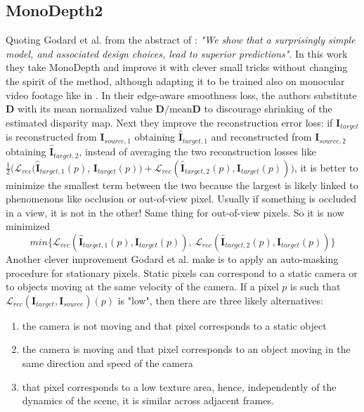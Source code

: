 \subsection{MonoDepth2}
Quoting Godard et al. from the abstract of \cite{MonoDepth2}: \textit{"We show that a surprisingly simple model, and associated design choices, lead to superior predictions"}.
In this work they take MonoDepth \cite{MonoDepth} and improve it with clever small tricks without changing the spirit of the method, although adapting it to be trained also on monocular video footage like in \cite{SfMLearner}.
In their edge-aware smoothness loss, the authors substitute $\mathbf{D}$ with its mean normalized value $\mathbf{D} / \text{mean} \mathbf{D}$ to discourage shrinking of the estimated disparity map.
Next they improve the reconstruction error loss: if $\mathbf{I}_{target}$ is reconstructed from $\mathbf{I}_{source, 1}$ obtaining $\hat{\mathbf{I}}_{target, 1}$ and reconstructed from $\mathbf{I}_{source, 2}$ obtaining $\hat{\mathbf{I}}_{target, 2}$, instead of averaging the two reconstruction losses like $\frac{1}{2}(\mathcal{L}_{rec}(\hat{\mathbf{I}}_{target, 1}(p)$, $\mathbf{I}_{target}(p)) + \mathcal{L}_{rec}(\hat{\mathbf{I}}_{target, 2}(p), \mathbf{I}_{target}(p)))$, it is better to minimize the smallest term between the two because the largest is likely linked to phenomenons like occlusion or out-of-view pixel.
Usually if something is occluded in a view, it is not in the other! Same thing for out-of-view pixels.
So it is now minimized
\[
	min \{ \mathcal{L}_{rec}(\hat{\mathbf{I}}_{target, 1}(p), \mathbf{I}_{target}(p)), \, \mathcal{L}_{rec}(\hat{\mathbf{I}}_{target, 2}(p), \mathbf{I}_{target}(p)) \}
\]
Another clever improvement Godard et al. make is to apply an auto-masking procedure for stationary pixels.
Static pixels can correspond to a static camera or to objects moving at the same velocity of the camera.
If a pixel $p$ is such that $\mathcal{L}_{rec}(\mathbf{I}_{target}, \mathbf{I}_{source})(p)$ is "low", then there are three likely alternatives:
\begin{enumerate}
\item the camera is not moving and that pixel corresponds to a static object
\item the camera is moving and that pixel corresponds to an object moving in the same direction and speed of the camera
\item that pixel corresponds to a low texture area, hence, independently of the dynamics of the scene, it is similar across adjacent frames.
\end{enumerate}
